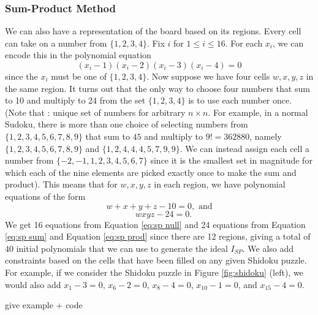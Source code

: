 \documentclass[../main.tex]{subfiles}
\begin{document}
            \subsubsection{Sum-Product Method}

            We can also have a representation of the board based on its regions. Every cell can take on a number from $\{1,2,3,4\}$. Fix $i$ for $1\leq i\leq 16$. For each $x_i$, we can encode this in the polynomial equation
            \begin{equation}
                \label{eq:sp null}
                (x_i-1)(x_i-2)(x_i-3)(x_i-4)=0
            \end{equation}
            since the $x_i$ must be one of $\{1,2,3,4\}$. Now suppose we have four cells $w,x,y,z$ in the same region. It turns out that the only way to choose four numbers that sum to 10 and multiply to 24 from the set $\{1,2,3,4\}$ is to use each number once. (Note that : {\color{red} unique set of numbers for arbitrary $n\times n$.} For example, in a normal Sudoku, there is more than one choice of selecting numbers from $\{1,2,3,4,5,6,7,8,9\}$ that sum to $45$ and multiply to $9!=362880$, namely $\{1,2,3,4,5,6,7,8,9\}$ and $\{1,2,4,4,4,5,7,9,9\}$. We can instead assign each cell a number from $\{-2,-1,1,2,3,4,5,6,7\}$ since it is the smallest set in magnitude for which each of the nine elements are picked exactly once to make the sum and product). This means that for $w,x,y,z$ in each region, we have polynomial equations of the form
            \begin{equation}
                \label{eq:sp sum}
                w+x+y+z-10=0, \text{ and} 
            \end{equation}
            \begin{equation}
                \label{eq:sp prod}
                \quad wxyz -24 = 0.
            \end{equation}
            We get 16 equations from Equation \ref{eq:sp null} and 24 equations from Equation \ref{eq:sp sum} and Equation \ref{eq:sp prod} since there are 12 regions, giving a total of 40 initial polynomials that we can use to generate the ideal $I_{SP}$. We also add constraints based on the cells that have been filled on any given Shidoku puzzle. For example, if we consider the Shidoku puzzle in Figure \ref{fig:shidoku} (left), we would also add $x_1-3=0$, $x_6-2=0$, $x_8-4=0$, $x_{10}-1=0$, and $x_{15}-4=0$.  
            
            {\color{red} give example + code}
\end{document}
